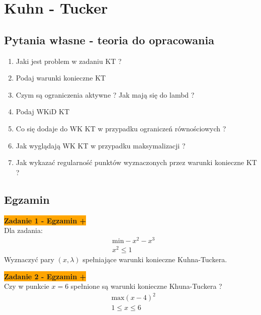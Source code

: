 \documentclass[a4paper,11pt]{article}
\begin{document}
\newpage
\section{Kuhn - Tucker}

\subsection{Pytania własne - teoria do opracowania}

\begin{enumerate}

\item Jaki jest problem w zadaniu KT ?
\item Podaj warunki konieczne KT
\item Czym są ograniczenia aktywne ? Jak mają się do lambd ?
\item Podaj WKiD KT 
\item Co się dodaje do WK KT w przypadku ograniczeń równościowych ?
\item Jak wyglądają WK KT w przypadku maksymalizacji ?
\item Jak wykazać regularność punktów wyznaczonych przez warunki konieczne KT ?

\end{enumerate}


\subsection{Egzamin}

\begin{framed}
\textbf{\colorbox{orange}{Zadanie 1 - Egzamin + }} \\
Dla zadania:
\begin{align*}
& \text{min} -x^2-x^3 \\
& x^2 \leq 1 
\end{align*}
Wyznaczyć pary \( (x,\lambda ) \) spełniające warunki konieczne Kuhna-Tuckera.
\end{framed}

\begin{framed}
\textbf{\colorbox{orange}{Zadanie 2 - Egzamin + }} \\
Czy w punkcie \( x = 6 \) spełnione są warunki konieczne Khuna-Tuckera ?
\begin{align*}
& \text{max} (x-4)^2 \\
& 1 \leq x \leq 6 
\end{align*}
\end{framed}
\end{document}
